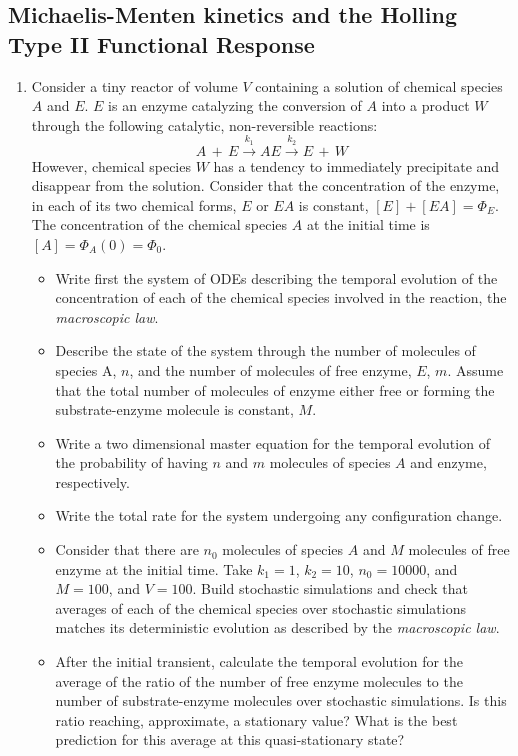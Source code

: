 \subsection{Michaelis-Menten kinetics and the Holling Type II Functional Response}
\begin{enumerate}
\item Consider a tiny reactor of volume $V$ containing a solution of chemical species $A$ and $E$. $E$ is an enzyme catalyzing the conversion of $A$ into a product $W$ through the following catalytic, non-reversible reactions:
\begin{equation}
A \,+ \,E  \xrightarrow{k_1} AE \xrightarrow{k_2} E \,+\, W \nonumber
\end{equation}    
However, chemical species $W$ has a tendency to immediately precipitate and disappear from the solution. Consider that the concentration of the enzyme, in each of its two chemical forms, $E$ or $EA$ is constant, $[E] + [EA] = \Phi_E$. The concentration of the chemical species $A$ at the initial time is $[A]= \Phi_A(0) = \Phi_0$. 
\begin{itemize}
\item Write first the system of ODEs describing the temporal evolution of the concentration of each of the chemical species involved in the reaction, the {\em macroscopic law}. 
\item Describe the state of the system through the number of molecules of species A, $n$, and the number of molecules of free enzyme, $E$, $m$. Assume that the total number of molecules of enzyme either free or forming the substrate-enzyme molecule is constant, $M$.   
\item Write a two dimensional master equation for the temporal evolution of the probability of having $n$ and $m$ molecules of species $A$ and enzyme, respectively. 
\item Write the total rate for the system undergoing any configuration change. 
\item Consider that there are $n_0$ molecules of species $A$ and $M$ molecules of free enzyme at the initial time. Take $k_1 = 1$, $k_2 = 10$, $n_0 = 10000$, and $M=100$, and $V=100$. Build stochastic simulations and check that averages of each of the chemical species over stochastic simulations matches its deterministic evolution as described by the {\em macroscopic law}.  
\item After the initial transient, calculate the temporal evolution for the average of the ratio of the number of free enzyme molecules to the number of substrate-enzyme molecules over stochastic simulations. Is this ratio reaching, approximate, a stationary value? What is the best prediction for this average at this quasi-stationary state?  
\end{itemize}
\end{enumerate}

